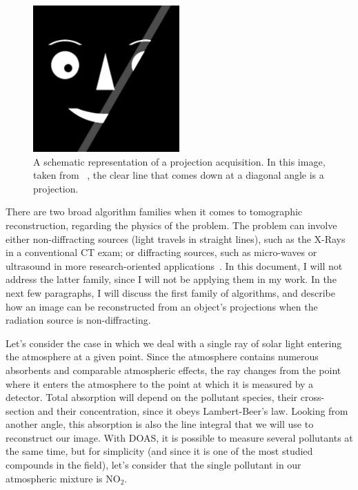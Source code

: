 \begin{figure}[htpb]
    \centering
    \includegraphics[width=0.5\textwidth]{img/png/projections.png}
    \caption{A schematic representation of a projection acquisition. In
    this image, taken from ~\cite{Herman2009}, the clear line that comes
    down at a diagonal angle is a projection.}
    \label{fig:projection}
\end{figure}

There are two broad algorithm families when it comes to tomographic
reconstruction, regarding the physics of the problem. The problem can
involve either non-diffracting sources (light travels in straight
lines), such as the X-Rays in a conventional \gls{CT} exam; or
diffracting sources, such as micro-waves or ultrasound in more
research-oriented applications~\cite{Kak2001}. In this document, I will
not address the latter family, since I will not be applying them in my
work. In the next few paragraphs, I will discuss the first family of
algorithms, and describe how an image can be reconstructed from an
object's projections when the radiation source is non-diffracting.

Let's consider the case in which we deal with a single ray of solar
light entering the atmosphere at a given point. Since the atmosphere
contains numerous absorbents and comparable atmospheric effects, the ray
changes from the point where it enters the atmosphere to the point at
which it is measured by a detector. Total absorption will depend on the
pollutant species, their cross-section and their concentration, since it
obeys Lambert-Beer's law. Looking from another angle, this absorption
is also the line integral that we will use to reconstruct our image.
With \gls{DOAS}, it is possible to measure several pollutants at the
same time, but for simplicity (and since it is one of the most studied
compounds in the field), let's consider that the single pollutant in our
atmospheric mixture is NO$_2$.

